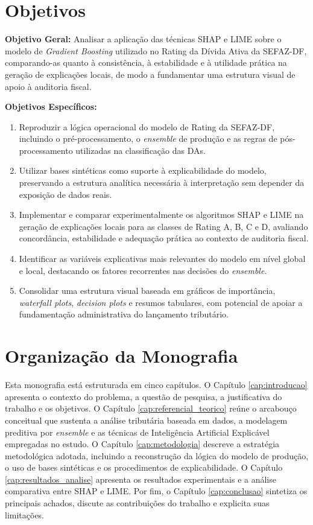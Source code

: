 \section{Objetivos}

\textbf{Objetivo Geral:}
Analisar a aplicação das técnicas SHAP e LIME sobre o modelo de \textit{Gradient Boosting} utilizado no Rating da Dívida Ativa da SEFAZ-DF, comparando-as quanto à consistência, à estabilidade e à utilidade prática na geração de explicações locais, de modo a fundamentar uma estrutura visual de apoio à auditoria fiscal.

\textbf{Objetivos Específicos:}
\begin{enumerate}
\item Reproduzir a lógica operacional do modelo de Rating da SEFAZ-DF, incluindo o pré-processamento, o \textit{ensemble} de produção e as regras de pós-processamento utilizadas na classificação das DAs.
\item Utilizar bases sintéticas como suporte à explicabilidade do modelo, preservando a estrutura analítica necessária à interpretação sem depender da exposição de dados reais.
\item Implementar e comparar experimentalmente os algoritmos SHAP e LIME na geração de explicações locais para as classes de Rating A, B, C e D, avaliando concordância, estabilidade e adequação prática ao contexto de auditoria fiscal.
\item Identificar as variáveis explicativas mais relevantes do modelo em nível global e local, destacando os fatores recorrentes nas decisões do \textit{ensemble}.
\item Consolidar uma estrutura visual baseada em gráficos de importância, \textit{waterfall plots}, \textit{decision plots} e resumos tabulares, com potencial de apoiar a fundamentação administrativa do lançamento tributário.
\end{enumerate}

\section{Organização da Monografia}

Esta monografia está estruturada em cinco capítulos. O Capítulo \ref{cap:introducao} apresenta o contexto do problema, a questão de pesquisa, a justificativa do trabalho e os objetivos. O Capítulo \ref{cap:referencial_teorico} reúne o arcabouço conceitual que sustenta a análise tributária baseada em dados, a modelagem preditiva por \textit{ensemble} e as técnicas de Inteligência Artificial Explicável empregadas no estudo. O Capítulo \ref{cap:metodologia} descreve a estratégia metodológica adotada, incluindo a reconstrução da lógica do modelo de produção, o uso de bases sintéticas e os procedimentos de explicabilidade. O Capítulo \ref{cap:resultados_analise} apresenta os resultados experimentais e a análise comparativa entre SHAP e LIME. Por fim, o Capítulo \ref{cap:conclusao} sintetiza os principais achados, discute as contribuições do trabalho e explicita suas limitações.
